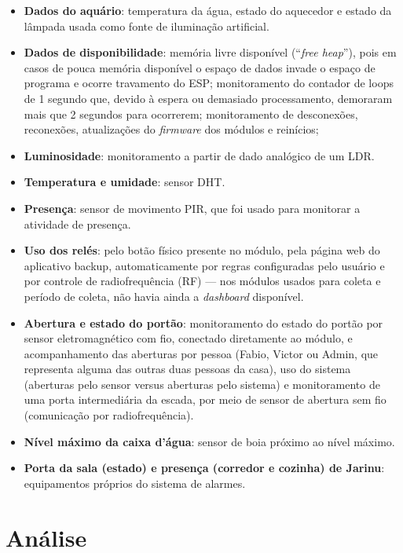 \begin{itemize}
	\item \textbf{Dados do aquário}: temperatura da água, estado do aquecedor e estado da lâmpada usada como fonte de iluminação artificial.
	\item \textbf{Dados de disponibilidade}: memória livre disponível (“\emph{free heap}”), pois em casos de pouca memória disponível o espaço de dados invade o espaço de programa e ocorre travamento do ESP; monitoramento do contador de loops de 1 segundo que, devido à espera ou demasiado processamento, demoraram mais que 2 segundos para ocorrerem; monitoramento de desconexões, reconexões, atualizações do \emph{firmware} dos módulos e reinícios;
	\item \textbf{Luminosidade}: monitoramento a partir de dado analógico de um LDR.
	\item \textbf{Temperatura e umidade}: sensor DHT.
	\item \textbf{Presença}: sensor de movimento PIR, que foi usado para monitorar a atividade de presença.
	\item \textbf{Uso dos relés}: pelo botão físico presente no módulo, pela página web do aplicativo backup, automaticamente por regras configuradas pelo usuário e por controle de radiofrequência (RF) --- nos módulos usados para coleta e período de coleta, não havia ainda a \textit{dashboard} disponível.
	\item \textbf{Abertura e estado do portão}: monitoramento do estado do portão por sensor eletromagnético com fio, conectado diretamente ao módulo, e acompanhamento das aberturas por pessoa (Fabio, Victor ou Admin, que representa alguma das outras duas pessoas da casa), uso do sistema (aberturas pelo sensor versus aberturas pelo sistema) e monitoramento de uma porta intermediária da escada, por meio de sensor de abertura sem fio (comunicação por radiofrequência).
	\item \textbf{Nível máximo da caixa d’água}: sensor de boia próximo ao nível máximo.
	\item \textbf{Porta da sala (estado) e presença (corredor e cozinha) de Jarinu}: equipamentos próprios do sistema de alarmes.

\end{itemize}

\section{Análise}

